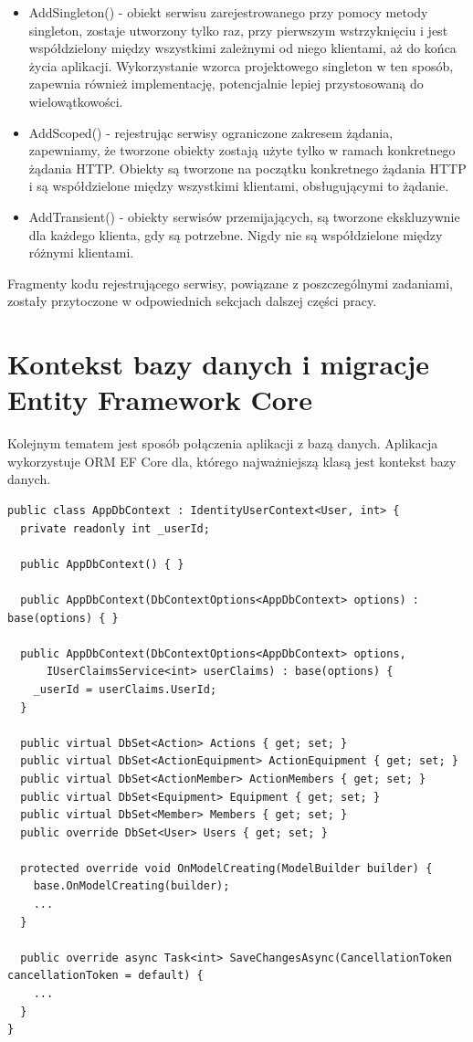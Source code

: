 \begin{itemize}
    \item AddSingleton() - obiekt serwisu zarejestrowanego przy pomocy metody singleton, zostaje utworzony tylko raz, przy pierwszym wstrzyknięciu i jest współdzielony między wszystkimi zależnymi od niego klientami, aż do końca życia aplikacji. Wykorzystanie wzorca projektowego singleton w ten sposób, zapewnia również implementację, potencjalnie lepiej przystosowaną do wielowątkowości.
    \item AddScoped() - rejestrując serwisy ograniczone zakresem żądania, zapewniamy, że tworzone obiekty zostają użyte tylko w ramach konkretnego żądania HTTP. Obiekty są tworzone na początku konkretnego żądania HTTP i są współdzielone między wszystkimi klientami, obsługującymi to żądanie.
    \item AddTransient() - obiekty serwisów przemijających, są tworzone ekskluzywnie dla każdego klienta, gdy są potrzebne. Nigdy nie są współdzielone między różnymi klientami.
\end{itemize}

Fragmenty kodu rejestrującego serwisy, powiązane z poszczególnymi zadaniami, zostały przytoczone w odpowiednich sekcjach dalszej części pracy. 

\section{Kontekst bazy danych i migracje Entity Framework Core}

Kolejnym tematem jest sposób połączenia aplikacji z bazą danych. Aplikacja wykorzystuje ORM EF Core dla, którego najważniejszą klasą jest kontekst bazy danych.

\begin{lstlisting}[language=CSharp, caption=Klasa kontekstu bazy danych, label=lst:appDbContext]
public class AppDbContext : IdentityUserContext<User, int> {
  private readonly int _userId;

  public AppDbContext() { }

  public AppDbContext(DbContextOptions<AppDbContext> options) : base(options) { }

  public AppDbContext(DbContextOptions<AppDbContext> options, 
      IUserClaimsService<int> userClaims) : base(options) {
    _userId = userClaims.UserId;
  }

  public virtual DbSet<Action> Actions { get; set; }
  public virtual DbSet<ActionEquipment> ActionEquipment { get; set; }
  public virtual DbSet<ActionMember> ActionMembers { get; set; }
  public virtual DbSet<Equipment> Equipment { get; set; }
  public virtual DbSet<Member> Members { get; set; }
  public override DbSet<User> Users { get; set; }

  protected override void OnModelCreating(ModelBuilder builder) {
    base.OnModelCreating(builder);
    ...
  }

  public override async Task<int> SaveChangesAsync(CancellationToken cancellationToken = default) {
    ...
  }
}
\end{lstlisting}

